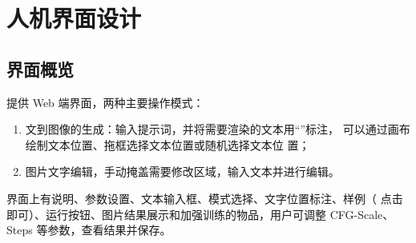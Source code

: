 \documentclass[a4paper,12pt]{article}
\begin{document}
\section{人机界面设计}
\subsection{界面概览}
提供 Web 端界面，两种主要操作模式：
\begin{enumerate}
    \item 文到图像的生成：输入提示词，并将需要渲染的文本用“”标注，
    可以通过画布绘制文本位置、拖框选择文本位置或随机选择文本位
    置；
    \item 图片文字编辑，手动掩盖需要修改区域，输入文本并进行编辑。

\end{enumerate}

界面上有说明、参数设置、文本输入框、模式选择、文字位置标注、样例（
点击即可）、运行按钮、图片结果展示和加强训练的物品，用户可调整 CFG-Scale、Steps 等参数，查看结果并保存。
\end{document}
